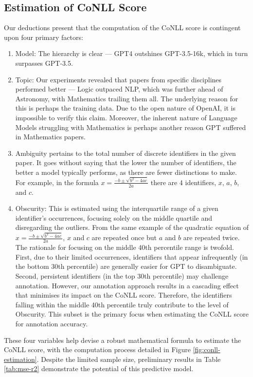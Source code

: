 \subsection{Estimation of CoNLL Score}
Our deductions present that the computation of the CoNLL score is contingent upon four primary factors: 
    \begin{enumerate}
        \item Model: The hierarchy is clear — GPT4 outshines GPT-3.5-16k, which in turn surpasses GPT-3.5. 
        \item Topic: Our experiments revealed that papers from specific disciplines performed better — Logic outpaced NLP, which was further ahead of Astronomy, with Mathematics trailing them all. The underlying reason for this is perhaps the training data. Due to the open nature of OpenAI, it is impossible to verify this claim. Moreover, the inherent nature of Language Models struggling with Mathematics is perhaps another reason GPT suffered in Mathematics papers.
        \item Ambiguity pertains to the total number of discrete identifiers in the given paper. It goes without saying that the lower the number of identifiers, the better a model typically performs, as there are fewer distinctions to make. For example, in the formula $x = \frac{-b \pm \sqrt{b^2 - 4ac}}{2a}$ there are 4 identifiers, $x$, $a$, $b$, and $c$.
        \item Obscurity: This is estimated using the interquartile range of a given identifier's occurrences, focusing solely on the middle quartile and disregarding the outliers. From the same example of the quadratic equation of $x = \frac{-b \pm \sqrt{b^2 - 4ac}}{2a}$, $x$ and $c$ are repeated once but $a$ and $b$ are repeated twice. The rationale for focusing on the middle 40th percentile range is twofold. First, due to their limited occurrences, identifiers that appear infrequently (in the bottom 30th percentile) are generally easier for GPT to disambiguate. Second, persistent identifiers (in the top 30th percentile) may challenge annotation. However, our annotation approach results in a cascading effect that minimises its impact on the CoNLL score. Therefore, the identifiers falling within the middle 40th percentile truly contribute to the level of Obscurity. This subset is the primary focus when estimating the CoNLL score for annotation accuracy.
    \end{enumerate}

These four variables help devise a robust mathematical formula to estimate the CoNLL score, with the computation process detailed in Figure \ref{fig:conll-estimation}. Despite the limited sample size, preliminary results in Table \ref{tab:mse-r2} demonstrate the potential of this predictive model.

